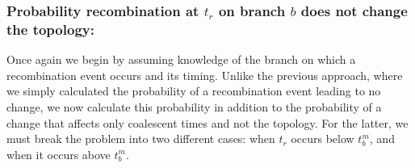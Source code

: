\documentclass[11pt]{article}
\begin{document}
\subsubsection{Probability recombination at $t_r$ on branch $b$ does not change the topology:}
Once again we begin by assuming knowledge of the branch on which a recombination event occurs 
and its timing.
Unlike the previous approach, %
where we 
simply %
calculated the probability of 
a recombination event leading to no change, we now 
calculate this probability in addition to the probability of a change that
affects only coalescent times and not the topology. 
For the latter, we must 
break the problem into two different cases: 
when $t_r$ occurs below $t_b^m$, and when it occurs above $t_b^m$.




\end{document}
